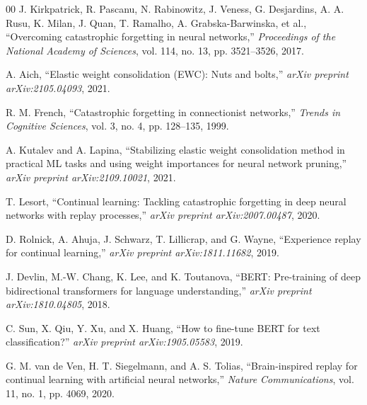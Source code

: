 \documentclass[conference]{IEEEtran}
\begin{document}
\begin{thebibliography}{00}
 J. Kirkpatrick, R. Pascanu, N. Rabinowitz, J. Veness, G. Desjardins, A. A. Rusu, K. Milan, J. Quan, T. Ramalho, A. Grabska-Barwinska, et al., ``Overcoming catastrophic forgetting in neural networks,'' \textit{Proceedings of the National Academy of Sciences}, vol. 114, no. 13, pp. 3521--3526, 2017.

 A. Aich, ``Elastic weight consolidation (EWC): Nuts and bolts,'' \textit{arXiv preprint arXiv:2105.04093}, 2021.

 R. M. French, ``Catastrophic forgetting in connectionist networks,'' \textit{Trends in Cognitive Sciences}, vol. 3, no. 4, pp. 128--135, 1999.

 A. Kutalev and A. Lapina, ``Stabilizing elastic weight consolidation method in practical ML tasks and using weight importances for neural network pruning,'' \textit{arXiv preprint arXiv:2109.10021}, 2021.

 T. Lesort, ``Continual learning: Tackling catastrophic forgetting in deep neural networks with replay processes,'' \textit{arXiv preprint arXiv:2007.00487}, 2020.

 D. Rolnick, A. Ahuja, J. Schwarz, T. Lillicrap, and G. Wayne, ``Experience replay for continual learning,'' \textit{arXiv preprint arXiv:1811.11682}, 2019.

 J. Devlin, M.-W. Chang, K. Lee, and K. Toutanova, ``BERT: Pre-training of deep bidirectional transformers for language understanding,'' \textit{arXiv preprint arXiv:1810.04805}, 2018.

 C. Sun, X. Qiu, Y. Xu, and X. Huang, ``How to fine-tune BERT for text classification?'' \textit{arXiv preprint arXiv:1905.05583}, 2019.

 G. M. van de Ven, H. T. Siegelmann, and A. S. Tolias, ``Brain-inspired replay for continual learning with artificial neural networks,'' \textit{Nature Communications}, vol. 11, no. 1, pp. 4069, 2020.
\end{thebibliography}
\end{document}
